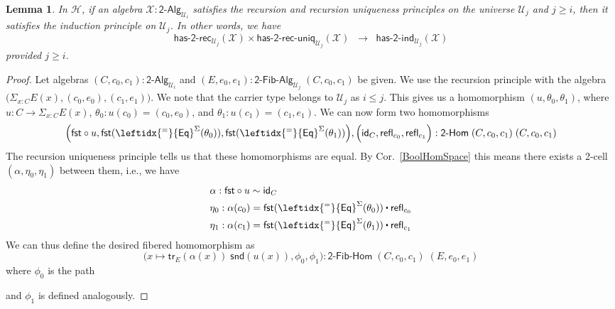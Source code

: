 \documentclass[11pt]{article}
\newcommand{\X}{\mathcal{X}}
\newcommand{\fst}{\mathsf{fst}}
\newcommand{\snd}{\mathsf{snd}}
\newcommand{\comp}{\circ}
\newcommand{\idfun}[1]{\mathsf{id}_{#1}}
\newcommand{\sm}[1]{\Sigma_{#1}}
\newcommand{\refl}{\mathsf{refl}}
\newcommand{\idtodpair}{\leftidx{^=}{\mathsf{Eq}}^{\Sigma}}
\newcommand{\UU}{\mathcal{U}}
\newcommand{\BoolAlg}{\mathsf{2}\text{-}\mathsf{Alg}}
\newcommand{\BoolHom}{\mathsf{2}\text{-}\mathsf{Hom}}
\newcommand{\HasBoolRec}{\mathsf{has}\text{-}\mathsf{2}\text{-}\mathsf{rec}}
\newcommand{\HasBoolInd}{\mathsf{has}\text{-}\mathsf{2}\text{-}\mathsf{ind}}
\newcommand{\HasBoolRecUniq}{\mathsf{has}\text{-}\mathsf{2}\text{-}\mathsf{rec}\text{-}\mathsf{uniq}}
\newcommand{\BoolFibAlg}{\mathsf{2}\text{-}\mathsf{Fib}\text{-}\mathsf{Alg}}
\newcommand{\BoolFibHom}{\mathsf{2}\text{-}\mathsf{Fib}\text{-}\mathsf{Hom}}
\newcommand{\trans}{\mathsf{tr}}
\newcommand{\Hint}{\mathcal{H}}
\newcommand{\ct}{%
  \mathchoice{\mathbin{\raisebox{0.5ex}{$\displaystyle\centerdot$}}}%
             {\mathbin{\raisebox{0.5ex}{$\centerdot$}}}%
             {\mathbin{\raisebox{0.25ex}{$\scriptstyle\,\centerdot\,$}}}%
             {\mathbin{\raisebox{0.1ex}{$\scriptscriptstyle\,\centerdot\,$}}}}
\newtheorem{lemma}[theorem]{Lemma}
\theoremstyle{definition}
\begin{document}
\begin{lemma}\label{lem:BoolRecUniqImpIndInt}
In $\Hint$, if an algebra $\X : \BoolAlg_{\UU_i}$ satisfies the recursion and recursion uniqueness principles on the universe $\UU_j$ and $j \geq i$, then it satisfies the induction principle on $\UU_j$. In other words, we have
\[ \HasBoolRec_{\UU_j}(\X) \times \HasBoolRecUniq_{\UU_j}(\X) \;\; \rightarrow \; \; \HasBoolInd_{\UU_j}(\X) \]
provided $j \geq i$.
\end{lemma}
\begin{proof}
Let algebras $(C,c_0,c_1) : \BoolAlg_{\UU_i}$ and $(E,e_0,e_1) : \BoolFibAlg_{\UU_j} \; (C,c_0,c_1)$ be given. 
We use the recursion principle with the algebra $\big(\sm{x:C} E(x), (c_0,e_0), (c_1,e_1)\big)$. We note that the carrier type belongs to $\UU_j$ as $i \leq j$. This gives us a homomorphism $(u,\theta_0,\theta_1)$, where $u : C \to \sm{x:C} E(x)$, $\theta_0 : u(c_0) = (c_0,e_0)$, and $\theta_1 : u(c_1) = (c_1,e_1)$. We can now form two homomorphisms 
\[\Big(\fst \comp u, \fst(\idtodpair(\theta_0)), \fst(\idtodpair(\theta_1))\Big), \Big(\idfun{C}, \refl_{c_0}, \refl_{c_1}\Big) : \BoolHom \; (C,c_0,c_1) \; (C,c_0,c_1)\]
The recursion uniqueness principle tells us that these homomorphisms are equal. By Cor.~\ref{BoolHomSpace} this means there exists a 2-cell $(\alpha,\eta_0,\eta_1)$ between them, i.e., we have 
\begin{align*}
& \alpha : \fst \comp u \sim \idfun{C} \\
& \eta_0 : \alpha(c_0) = \fst(\idtodpair(\theta_0)) \ct \refl_{c_0} \\
& \eta_1 : \alpha(c_1) = \fst(\idtodpair(\theta_1)) \ct \refl_{c_1}
\end{align*}
We can thus define the desired fibered homomorphism as \[\Big(x \mapsto \trans_E(\alpha(x)) \; \snd(u(x)), \phi_0, \phi_1\Big) : \BoolFibHom \; (C,c_0,c_1) \; (E,e_0,e_1)\]
where $\phi_0$ is the path
\begin{center}
\end{center}
and $\phi_1$ is defined analogously.
\end{proof}
\end{document}

